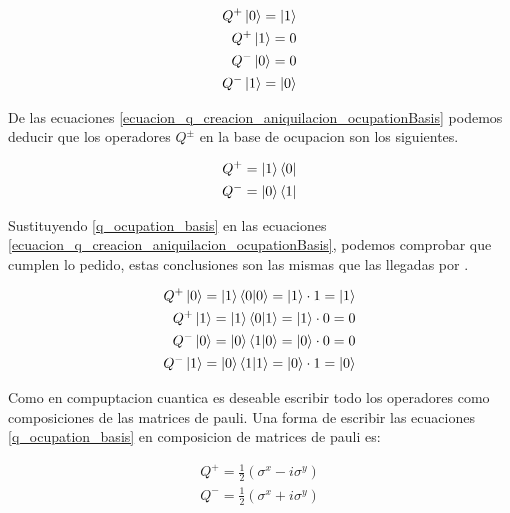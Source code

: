 \documentclass[12pt, oneside]{article}
\begin{document}
\begin{equation}\label{ecuacion_q_creacion_aniquilacion_ocupationBasis}
    \begin{split}
        Q^{+}\ket{0}=\ket{1}\\
        Q^{+}\ket{1}=0\\
        Q^{-}\ket{0}=0\\
        Q^{-}\ket{1}=\ket{0}
    \end{split}
\end{equation}

De las ecuaciones \ref{ecuacion_q_creacion_aniquilacion_ocupationBasis} podemos deducir que los operadores $Q^{\pm}$ en la base de ocupacion son los siguientes.

\begin{equation}\label{q_ocupation_basis}
\begin{split}
    Q^{+}=\ket{1}\bra{0}\\
    Q^{-}=\ket{0}\bra{1}
\end{split}
    \end{equation}

Sustituyendo \ref{q_ocupation_basis} en las ecuaciones \ref{ecuacion_q_creacion_aniquilacion_ocupationBasis}, podemos comprobar que cumplen lo pedido, estas conclusiones son las mismas que las llegadas por \cite{zhang2022quantum}.

\begin{equation}
    \begin{split}
        Q^{+}\ket{0}=\ket{1}\bra{0}\ket{0}=\ket{1}\cdot1=\ket{1}\\
        Q^{+}\ket{1}=\ket{1}\bra{0}\ket{1}=\ket{1}\cdot0=0\\
        Q^{-}\ket{0}=\ket{0}\bra{1}\ket{0}=\ket{0}\cdot0=0\\
        Q^{-}\ket{1}=\ket{0}\bra{1}\ket{1}=\ket{0}\cdot1=\ket{0}
    \end{split}
\end{equation}

Como en compuptacion cuantica es deseable escribir todo los operadores como composiciones de las matrices de pauli. Una forma de escribir las ecuaciones \ref{q_ocupation_basis} en composicion de matrices de pauli es:

\begin{equation}
    \begin{split}
        Q^{+}=\frac{1}{2}\left(\sigma^x-i\sigma^y \right)\\
        Q^{-}=\frac{1}{2}\left(\sigma^x+i\sigma^y \right)
    \end{split}
\end{equation}
\end{document}
